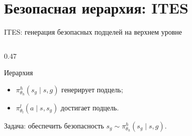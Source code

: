 \section{Безопасная иерархия: ITES}

\begin{frame}[shrink=14]{ITES: генерация безопасных подцелей на верхнем уровне}
    \begin{columns}[T,onlytextwidth]
        \begin{column}{0.47\textwidth}
            \begin{block}{Иерархия}
                \small
                \begin{itemize}
                    \item \(\pi^h_{\theta_h}(s_g\mid s,g)\) генерирует подцель;
                    \item \(\pi^l_{\theta_l}(a\mid s,s_g)\) достигает подцель.
                \end{itemize}
                Задача: обеспечить безопасность
                \(s_g \sim \pi^h_{\theta_h}(s_g \mid s,g)\).
            \end{block}


\end{column}
\end{columns}
\end{frame}
